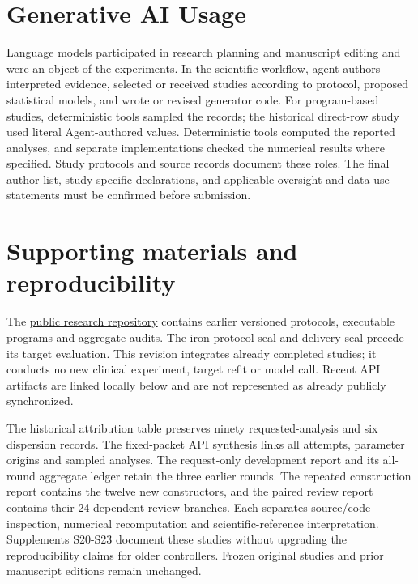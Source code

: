 \documentclass[11pt,letterpaper]{article}
\begin{document}
\section{Generative AI Usage}

Language models participated in research planning and manuscript editing and were an object of the experiments. In the scientific workflow, agent authors interpreted evidence, selected or received studies according to protocol, proposed statistical models, and wrote or revised generator code. For program-based studies, deterministic tools sampled the records; the historical direct-row study used literal Agent-authored values. Deterministic tools computed the reported analyses, and separate implementations checked the numerical results where specified. Study protocols and source records document these roles. The final author list, study-specific declarations, and applicable oversight and data-use statements must be confirmed before submission.


\section*{Supporting materials and reproducibility}

The \href{https://github.com/ziwang11112/evidence-guided-virtual-cohorts-2026}{public research repository} contains earlier versioned protocols, executable programs and aggregate audits. The iron \href{https://github.com/ziwang11112/evidence-guided-virtual-cohorts-2026/commit/bedd845768c1c938768f58fce685f53cbf97f3df}{protocol seal} and \href{https://github.com/ziwang11112/evidence-guided-virtual-cohorts-2026/commit/c88192edeb0bc63b60d0bfe6e3a7282ced9d2975}{delivery seal} precede its target evaluation. This revision integrates already completed studies; it conducts no new clinical experiment, target refit or model call. Recent API artifacts are linked locally below and are not represented as already publicly synchronized.


The historical attribution table preserves ninety requested-analysis and six dispersion records. The fixed-packet API synthesis links all attempts, parameter origins and sampled analyses. The request-only development report and its all-round aggregate ledger retain the three earlier rounds. The repeated construction report contains the twelve new constructors, and the paired review report contains their 24 dependent review branches. Each separates source/\allowbreak{}code inspection, numerical recomputation and scientific-reference interpretation. Supplements S20-S23 document these studies without upgrading the reproducibility claims for older controllers. Frozen original studies and prior manuscript editions remain unchanged.
\end{document}
